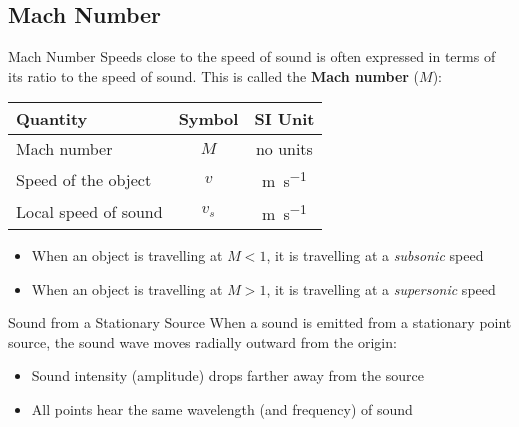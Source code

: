 \documentclass[12pt,compress,aspectratio=169]{beamer}
\newcommand{\eq}[2]{\vspace{#1}{\Large\begin{displaymath}#2\end{displaymath}}}
\begin{document}
\subsection[$M$]{Mach Number}

\begin{frame}{Mach Number}
  Speeds close to the speed of sound is often expressed in terms of its ratio
  to the speed of sound. This is called the \textbf{Mach number} ($M$):
  
  \eq{-.2in}{
    \boxed{M=\frac{v}{v_s}}
  }
  \begin{center}
    \begin{tabular}{l|c|c}
      \rowcolor{pink}
      \textbf{Quantity} & \textbf{Symbol} & \textbf{SI Unit} \\ \hline
      Mach number          & $M$   & no units \\
      Speed of the object  & $v$   & \si{\metre\per\second} \\
      Local speed of sound & $v_s$ & \si{\metre\per\second}
    \end{tabular}
  \end{center}
  \begin{itemize}
  \item When an object is travelling at $M<1$, it is travelling at a
    \emph{subsonic} speed
  \item When an object is travelling at $M>1$, it is travelling at a
    \emph{supersonic} speed
  \end{itemize}
\end{frame}



\begin{frame}{Sound from a Stationary Source}
  When a sound is emitted from a stationary point source, the sound wave moves
  radially outward from the origin:
  \begin{center}
    \begin{itemize}
    \item Sound intensity (amplitude) drops farther away from the source
    \item All points hear the same wavelength (and frequency) of sound
    \end{itemize}
  \end{center}
\end{frame}
\end{document}
